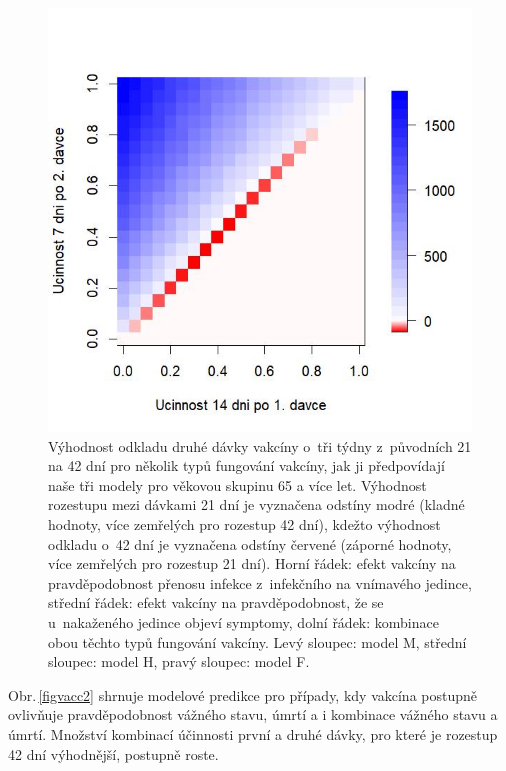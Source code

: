 \begin{figure}[ht!]
\begin{center}
\begin{minipage}[m]{0.3\linewidth}
		\end{minipage}
		\begin{minipage}[m]{0.3\linewidth}
			\includegraphics[width=\textwidth]{pic/SAM_DIFF_mean_T.jpg}
		\end{minipage}
	\end{center}
	\caption{Výhodnost odkladu druhé dávky vakcíny o~tři týdny z~původních 21 na 42 dní pro několik typů fungování vakcíny, jak ji předpovídají naše tři modely pro věkovou skupinu 65 a více let. Výhodnost rozestupu mezi dávkami 21 dní je vyznačena odstíny modré (kladné hodnoty, více zemřelých pro rozestup 42 dní), kdežto výhodnost odkladu o~42 dní je vyznačena odstíny červené (záporné hodnoty, více zemřelých pro rozestup 21 dní). Horní řádek: efekt vakcíny na pravděpodobnost přenosu infekce z~infekčního na vnímavého jedince, střední řádek: efekt vakcíny na pravděpodobnost, že se u~nakaženého jedince objeví symptomy, dolní řádek: kombinace obou těchto typů fungování vakcíny. Levý sloupec: model M, střední sloupec: model H, pravý sloupec: model F.}
	\label{figvacc1}
\end{figure}
 
Obr.\,\ref{figvacc2} shrnuje modelové predikce pro případy, kdy vakcína postupně ovlivňuje pravděpodobnost vážného stavu, úmrtí a i kombinace vážného stavu a úmrtí. Množství kombinací účinnosti první a druhé dávky, pro které je rozestup 42 dní výhodnější, postupně roste.
 
